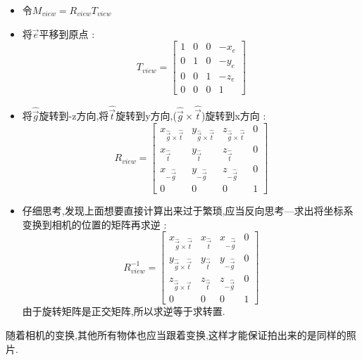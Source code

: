 \documentclass[UTF8,12pt]{ctexbook}
\begin{document}
{{{{\begin{itemize}
{                \begin{itemize}
                  \item 令$M_{view} = R_{view}T_{view}$
                  \item 将$\vec{e}$平移到原点 : $$
                          T_{view} = \begin{bmatrix}
                            1 & 0 & 0 & -x_e \\
                            0 & 1 & 0 & -y_e \\
                            0 & 0 & 1 & -z_e \\
                            0 & 0 & 0 & 1
                          \end{bmatrix}
                        $$
                  \item 将$\hat{\vec{g}}$旋转到-z方向,将$\hat{\vec{t}}$旋转到y方向,($\hat{\vec{g}} \times \hat{\vec{t}}$)旋转到x方向 : $$
                          R_{view} = \begin{bmatrix}
                            x_{\hat{\vec{g}} \times \hat{\vec{t}}} & y_{\hat{\vec{g}} \times \hat{\vec{t}}} & z_{\hat{\vec{g}} \times \hat{\vec{t}}} & 0 \\
                            x_{\hat{\vec{t}}}                      & y_{\hat{\vec{t}}}                      & z_{\hat{\vec{t}}}                      & 0 \\
                            x_{-\hat{\vec{g}}}                     & y_{-\hat{\vec{g}}}                     & z_{-\hat{\vec{g}}}                     & 0 \\
                            0                                      & 0                                      & 0                                      & 1
                          \end{bmatrix}
                        $$
                  \item 仔细思考,发现上面想要直接计算出来过于繁琐,应当反向思考—求出将坐标系变换到相机的位置的矩阵再求逆 : $$
                          R^{-1}_{view} = \begin{bmatrix}
                            x_{\hat{\vec{g}} \times \hat{\vec{t}}} & x_{\hat{\vec{t}}} & x_{-\hat{\vec{g}}} & 0 \\
                            y_{\hat{\vec{g}} \times \hat{\vec{t}}} & y_{\hat{\vec{t}}} & y_{-\hat{\vec{g}}} & 0 \\
                            z_{\hat{\vec{g}} \times \hat{\vec{t}}} & z_{\hat{\vec{t}}} & z_{-\hat{\vec{g}}} & 0 \\
                            0                                      & 0                 & 0                  & 1
                          \end{bmatrix}
                        $$
                        由于旋转矩阵是正交矩阵,所以求逆等于求转置.
                \end{itemize}
                随着相机的变换,其他所有物体也应当跟着变换,这样才能保证拍出来的是同样的照片.
                }


\end{itemize}}}}}
\end{document}
